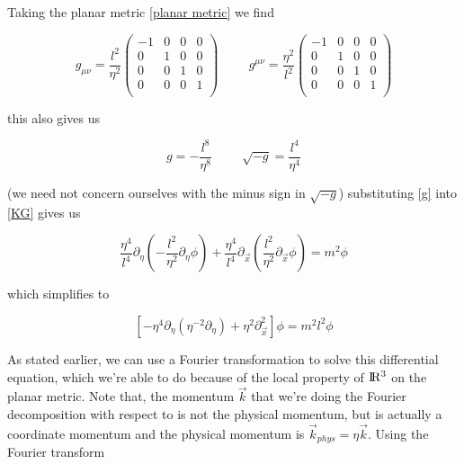 \documentclass[a4paper,11pt]{article}
\numberwithin{equation}{section}
\numberwithin{figure}{section}
\begin{document}
\begin{large}
Taking the planar metric \eqref{planar metric} we find 

\begin{equation}
\label{gmunu}    
    g_{\mu\nu}=\frac{l^2}{\eta^2} \begin{pmatrix}
    -1&0&0&0\\
      0&1&0&0\\
      0&0&1&0\\
      0&0&0&1\\
    \end{pmatrix}
    \hspace{1cm}
    g^{\mu\nu}=\frac{\eta^2}{l^2} \begin{pmatrix}
    -1&0&0&0\\
      0&1&0&0\\
      0&0&1&0\\
      0&0&0&1\\
    \end{pmatrix}
\end{equation}

this also gives us 

\begin{equation}
\label{g}    
    g=-\frac{l^8}{\eta^8} \hspace{1cm} \sqrt{-g}=\frac{l^4}{\eta^4}
\end{equation}

(we need not concern ourselves with the minus sign in $\sqrt{-g}$) substituting \eqref{g} into \eqref{KG}  gives us

\begin{equation}
\label{DE1}
    \frac{\eta^4}{l^4}\partial_\eta(-\frac{l^2}{\eta^2}\partial_\eta\phi) +\frac{\eta^4}{l^4}\partial_{\Vec{x}} (\frac{l^2}{\eta^2}\partial_{\Vec{x}}\phi)=m^2\phi
\end{equation}

which simplifies to

\begin{equation}
\label{DE}    
    [-\eta^4\partial_\eta(\eta^{-2}\partial_\eta)+\eta^2\partial^2_{\Vec{x}}]\phi=m^2l^2\phi
\end{equation}

As stated earlier, we can use a Fourier transformation to solve this differential equation, which we're able to do because of the local property of $\rm I\!R^3$ on the planar metric.
Note that, the momentum $\Vec{k}$ that we're doing the Fourier decomposition with respect to is not the physical momentum, but is actually a coordinate momentum and the physical momentum is $\Vec{k}_{phys}=\eta\Vec{k}$.
Using the Fourier transform


\end{large}
\end{document}
